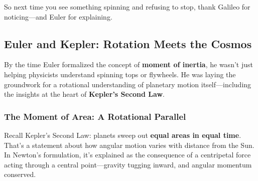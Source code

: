 So next time you see something spinning and refusing to stop, thank Galileo for noticing—and Euler for explaining.

\subsection{Euler and Kepler: Rotation Meets the Cosmos}

By the time Euler formalized the concept of \textbf{moment of inertia}, he wasn’t just helping physicists understand spinning tops or flywheels. He was laying the groundwork for a rotational understanding of planetary motion itself—including the insights at the heart of \textbf{Kepler’s Second Law}.

\subsubsection{The Moment of Area: A Rotational Parallel}

Recall Kepler’s Second Law: planets sweep out \textbf{equal areas in equal time}. That’s a statement about how angular motion varies with distance from the Sun. In Newton’s formulation, it’s explained as the consequence of a centripetal force acting through a central point—gravity tugging inward, and angular momentum conserved.

